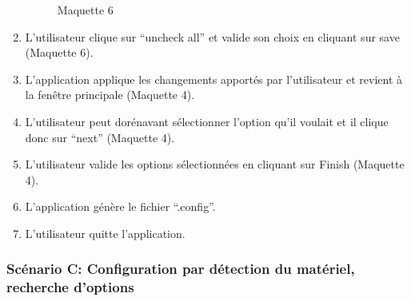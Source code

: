 \documentclass[16pts]{report}
\begin{document}
\begin{enumerate}
\begin{figure}[H]
        \caption{Maquette 6}
        \label{fig:Maq6}
    \end{figure}
    \item L’utilisateur clique sur “uncheck all” et valide son choix en cliquant
        sur save (Maquette 6).
    \item L’application applique les changements apportés par l’utilisateur et
        revient à la fenêtre principale (Maquette 4).
    \item L’utilisateur peut dorénavant sélectionner l’option qu’il voulait et
        il clique donc sur “next” (Maquette 4).
    \item L’utilisateur valide les options sélectionnées en cliquant sur Finish
        (Maquette 4).
    \item L’application génère le fichier “.config”.
    \item L’utilisateur quitte l’application.
\end{enumerate}

\subsubsection{Scénario C: Configuration par détection du matériel, recherche d'options}
\label{sssub:Scénario C: Configuration par détection du matériel, recherche d'options}
\end{document}

